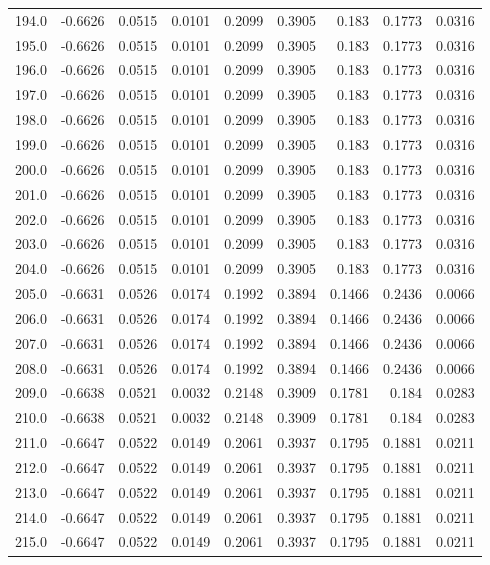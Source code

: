 \begin{longtable}{lrrrrrrrr}
194.0 & -0.6626 & 0.0515 & 0.0101 & 0.2099 & 0.3905 & 0.183 & 0.1773 & 0.0316 \\
195.0 & -0.6626 & 0.0515 & 0.0101 & 0.2099 & 0.3905 & 0.183 & 0.1773 & 0.0316 \\
196.0 & -0.6626 & 0.0515 & 0.0101 & 0.2099 & 0.3905 & 0.183 & 0.1773 & 0.0316 \\
197.0 & -0.6626 & 0.0515 & 0.0101 & 0.2099 & 0.3905 & 0.183 & 0.1773 & 0.0316 \\
198.0 & -0.6626 & 0.0515 & 0.0101 & 0.2099 & 0.3905 & 0.183 & 0.1773 & 0.0316 \\
199.0 & -0.6626 & 0.0515 & 0.0101 & 0.2099 & 0.3905 & 0.183 & 0.1773 & 0.0316 \\
200.0 & -0.6626 & 0.0515 & 0.0101 & 0.2099 & 0.3905 & 0.183 & 0.1773 & 0.0316 \\
201.0 & -0.6626 & 0.0515 & 0.0101 & 0.2099 & 0.3905 & 0.183 & 0.1773 & 0.0316 \\
202.0 & -0.6626 & 0.0515 & 0.0101 & 0.2099 & 0.3905 & 0.183 & 0.1773 & 0.0316 \\
203.0 & -0.6626 & 0.0515 & 0.0101 & 0.2099 & 0.3905 & 0.183 & 0.1773 & 0.0316 \\
204.0 & -0.6626 & 0.0515 & 0.0101 & 0.2099 & 0.3905 & 0.183 & 0.1773 & 0.0316 \\
205.0 & -0.6631 & 0.0526 & 0.0174 & 0.1992 & 0.3894 & 0.1466 & 0.2436 & 0.0066 \\
206.0 & -0.6631 & 0.0526 & 0.0174 & 0.1992 & 0.3894 & 0.1466 & 0.2436 & 0.0066 \\
207.0 & -0.6631 & 0.0526 & 0.0174 & 0.1992 & 0.3894 & 0.1466 & 0.2436 & 0.0066 \\
208.0 & -0.6631 & 0.0526 & 0.0174 & 0.1992 & 0.3894 & 0.1466 & 0.2436 & 0.0066 \\
209.0 & -0.6638 & 0.0521 & 0.0032 & 0.2148 & 0.3909 & 0.1781 & 0.184 & 0.0283 \\
210.0 & -0.6638 & 0.0521 & 0.0032 & 0.2148 & 0.3909 & 0.1781 & 0.184 & 0.0283 \\
211.0 & -0.6647 & 0.0522 & 0.0149 & 0.2061 & 0.3937 & 0.1795 & 0.1881 & 0.0211 \\
212.0 & -0.6647 & 0.0522 & 0.0149 & 0.2061 & 0.3937 & 0.1795 & 0.1881 & 0.0211 \\
213.0 & -0.6647 & 0.0522 & 0.0149 & 0.2061 & 0.3937 & 0.1795 & 0.1881 & 0.0211 \\
214.0 & -0.6647 & 0.0522 & 0.0149 & 0.2061 & 0.3937 & 0.1795 & 0.1881 & 0.0211 \\
215.0 & -0.6647 & 0.0522 & 0.0149 & 0.2061 & 0.3937 & 0.1795 & 0.1881 & 0.0211 \\

\end{longtable}
